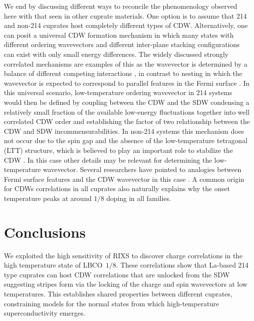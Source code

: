\documentclass[9pt,twocolumn,twoside]{pnas-new}
\def\LBCO{LBCO~$1/8$}
\begin{document}
We end by discussing different ways to reconcile the phenomenology observed here with that seen in other cuprate materials. One option is to assume that 214 and non-214 cuprates host completely different types of CDW. Alternatively, one can posit a universal CDW formation mechanism in which many states with different ordering wavevectors and different inter-plane stacking configurations can exist with only small energy differences. The widely discussed strongly correlated mechanisms are examples of this as the wavevector is determined by a balance of different competing interactions \cite{Zaanen1989, Vojta2009, Machida1989, Poilblanc1989, Kato1990, Emery1990, Kivelson2003, Castellani1995, Lorenzana2002, Dodaro2017}, in contrast to nesting in which the wavevector is expected to correspond to parallel features in the Fermi surface \cite{Johannes2008}. In this universal scenario, low-temperature ordering wavevector in 214 systems would then be defined by coupling between the CDW and the SDW condensing a relatively small fraction of the available low-energy fluctuations together into well correlated CDW order and establishing the factor of two relationship between the CDW and SDW incommensurabilities. In non-214 systems this mechanism does not occur due to the spin gap and the absence of the low-temperature tetragonal (LTT) structure, which is believed to play an important role to stabilize the CDW \cite{Tranquada1995}. In this case other details may be relevant for determining the low-temperature wavevector. Several researchers have pointed to analogies between Fermi surface features and the CDW wavevector in this case \cite{Ghiringhelli2012, Comin2014,Neto2014, tabis2014,Neto2016}. A common origin for CDWs correlations in all cuprates also naturally explains why the onset temperature peaks at around $1/8$ doping in all families. 

\section*{Conclusions}
We exploited the high sensitivity of RIXS to discover charge correlations in the high temperature state of \LBCO{}. These correlations show that La-based 214 type cuprates can host CDW correlations that are unlocked from the SDW suggesting stripes form via the locking of the charge and spin wavevectors at low temperatures. This establishes shared properties between different cuprates, constraining models for the normal states from which high-temperature superconductivity emerges. 
\end{document}
